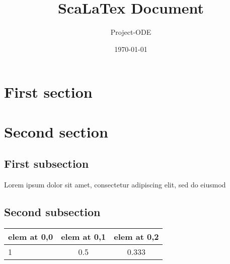 \documentclass{report}
\title{ScaLaTex Document}
\date{\today}
\author{Project-ODE}
\begin{document}
\maketitle

    \section{First section}
    
    \section{Second section}
    
        \subsection{First subsection}
        
            Lorem ipsum dolor sit amet, consectetur adipiscing elit, sed do eiusmod

        \subsection{Second subsection}
        
            \begin{tabular}{|l|cc}
            
                elem at 0,0 & elem at 0,1 & elem at 0,2\\
                \hline
                1 & 0.5 & 0.333\\
            
            \end{tabular}
\end{document}
